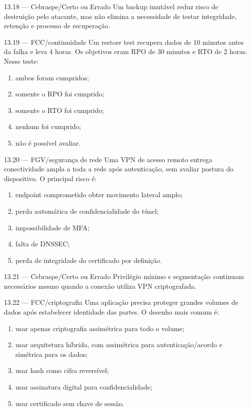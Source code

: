 \begin{questao}{ 13.18 — Cebraspe/Certo ou Errado}
Um backup imutável reduz risco de destruição pelo atacante, mas não elimina a necessidade de testar integridade, retenção e processo de recuperação.
\end{questao}

\begin{questao}{ 13.19 — FCC/continuidade}
Um restore test recupera dados de 10 minutos antes da falha e leva 4 horas. Os objetivos eram RPO de 30 minutos e RTO de 2 horas. Nesse teste:
\begin{enumerate}[label=\Alph*)]
\item ambos foram cumpridos;
\item somente o RPO foi cumprido;
\item somente o RTO foi cumprido;
\item nenhum foi cumprido;
\item não é possível avaliar.
\end{enumerate}
\end{questao}

\begin{questao}{ 13.20 — FGV/segurança de rede}
Uma VPN de acesso remoto entrega conectividade ampla a toda a rede após autenticação, sem avaliar postura do dispositivo. O principal risco é:
\begin{enumerate}[label=\Alph*)]
\item endpoint comprometido obter movimento lateral amplo;
\item perda automática de confidencialidade do túnel;
\item impossibilidade de MFA;
\item falta de DNSSEC;
\item perda de integridade do certificado por definição.
\end{enumerate}
\end{questao}

\begin{questao}{ 13.21 — Cebraspe/Certo ou Errado}
Privilégio mínimo e segmentação continuam necessários mesmo quando a conexão utiliza VPN criptografada.
\end{questao}

\begin{questao}{ 13.22 — FCC/criptografia}
Uma aplicação precisa proteger grandes volumes de dados após estabelecer identidade das partes. O desenho mais comum é:
\begin{enumerate}[label=\Alph*)]
\item usar apenas criptografia assimétrica para todo o volume;
\item usar arquitetura híbrida, com assimétrica para autenticação/acordo e simétrica para os dados;
\item usar hash como cifra reversível;
\item usar assinatura digital para confidencialidade;
\item usar certificado sem chave de sessão.
\end{enumerate}
\end{questao}

